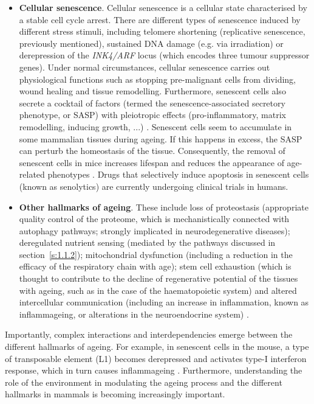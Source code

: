 \begin{itemize}
	\item \textbf{Cellular senescence}. Cellular senescence is a cellular state characterised by a stable cell cycle arrest. There are different types of senescence induced by different stress stimuli, including telomere shortening (replicative senescence, previously mentioned), sustained DNA damage (e.g. via irradiation) or derepression of the \textit{INK4/ARF} locus (which encodes three tumour suppressor genes)\cite{Lopez-Otin2013,Herranz2018}. Under normal circumstances, cellular senescence carries out physiological functions such as stopping pre-malignant cells from dividing, wound healing and tissue remodelling. Furthermore, senescent cells also secrete a cocktail of factors (termed the senescence-associated secretory phenotype, or \acrshort{SASP}) with pleiotropic effects (pro-inflammatory, matrix remodelling, inducing growth, ...) \cite{Herranz2018}. Senescent cells seem to accumulate in some mammalian tissues during ageing. If this happens in excess, the SASP can perturb the homeostasis of the tissue. Consequently, the removal of senescent cells in mice increases lifespan and reduces the appearance of age-related phenotypes \cite{Baker2011,Baker2016,Xu2018}. Drugs that selectively induce apoptosis in senescent cells (known as senolytics) \cite{Kirkland2017} are currently undergoing clinical trials in humans. 
	
	\item \textbf{Other hallmarks of ageing}. These include loss of proteostasis (appropriate quality control of the proteome, which is mechanistically connected with autophagy pathways; strongly implicated in neurodegenerative diseases); deregulated nutrient sensing (mediated by the pathways discussed in section~\ref{s:1.1.2}); mitochondrial dysfunction (including a reduction in the efficacy of the respiratory chain with age); stem cell exhaustion (which is thought to contribute to the decline of regenerative potential of the tissues with ageing, such as in the case of the haematopoietic system) and altered intercellular communication (including an increase in inflammation, known as inflammageing, or alterations in the neuroendocrine system) \cite{Lopez-Otin2013}.

	
\end{itemize}

Importantly, complex interactions and interdependencies emerge between the different hallmarks of ageing. For example, in senescent cells in the mouse, a type of transposable element (L1) becomes derepressed and activates type-I interferon response, which in turn causes inflammageing \cite{DeCecco2019}. Furthermore, understanding the role of the environment in modulating the ageing process and the different hallmarks in mammals is becoming increasingly important.  

